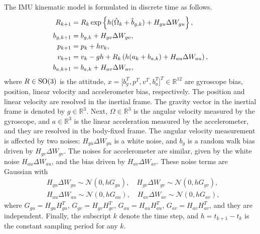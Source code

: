 The IMU kinematic model is formulated in discrete time as follows.
\begingroup \allowdisplaybreaks \begin{align}
	R_{k+1} &= R_k \exp\left\{  h(\hat{\Omega}_k + \hat{b}_{g,k}) + H_{gu}\Delta W_{gu}  \right\}, \label{eqn:posEst-kinematics-attitude} \\
	b_{g,k+1} &= b_{g,k} + H_{gv}\Delta W_{gv}, \label{eqn:posEst-kinematics-gyrobias} \\
	p_{k+1} &= p_k + hv_k, \label{eqn:posEst-kinematics-pos} \\
	v_{k+1} &= v_k - gh + R_k\left( h(a_k+b_{a,k}) + H_{au}\Delta W_{au} \right), \label{eqn:posEst-kinematics-velocity} \\
	b_{a,k+1} &= b_{a,k} + H_{av}\Delta W_{av}, \label{eqn:posEst-kinematics-accebias}
\end{align} \endgroup
where $R\in\mathrm{SO}(3)$ is the attitude, $x = \big[b_g^T, p^T, v^T, b_a^T\big]^T \in \mathbb{R}^{12}$ are gyroscope bias, position, linear velocity and accelerometer bias, respectively.
The position and linear velocity are resolved in the inertial frame.
The gravity vector in the inertial frame is denoted by $g\in\mathbb{R}^3$.
Next, $\Omega\in\mathbb{R}^3$ is the angular velocity measured by the gyroscope, and $a\in\mathbb{R}^3$ is the linear acceleration measured by the accelerometer, and they are resolved in the body-fixed frame.
The angular velocity measurement is affected by two noises: $H_{gu}\Delta W_{gu}$ is a white noise, and $b_g$ is a random walk bias driven by $H_{gv}\Delta W_{gv}$.
The noises for accelerometer are similar, given by the white noise $H_{au}\Delta W_{au}$, and the bias driven by $H_{av}\Delta W_{av}$.
These noise terms are Gaussian with
\begin{align}
	&H_{gu}\Delta W_{gu} \sim \mathcal{N}(0,hG_{gu}), \quad H_{gv}\Delta W_{gv} \sim \mathcal{N}(0,hG_{gv}), \label{eqn:posEst-gyroNoise} \\
	&H_{au}\Delta W_{au} \sim \mathcal{N}(0,hG_{au}), \quad H_{av}\Delta W_{av} \sim \mathcal{N}(0,hG_{av}),
\end{align}
where $G_{gu} = H_{gu}H_{gu}^T$, $G_{gv} = H_{gv}H_{gv}^T$, $G_{au} = H_{au}H_{au}^T$, $G_{av} = H_{av}H_{av}^T$, and they are independent.
Finally, the subscript $k$ denote the time step, and $h = t_{k+1}-t_k$ is the constant sampling period for any $k$.

